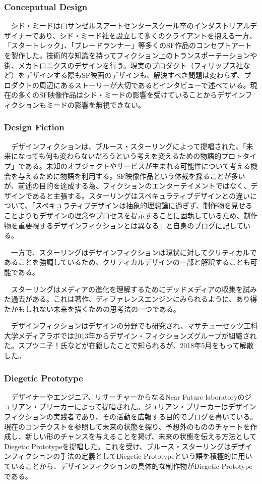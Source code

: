 \subsubsection{Conceputual Design}
　シド・ミードはロサンゼルスアートセンタースクール卒のインダストリアルデザイナーであり、シド・ミード社を設立して多くのクライアントを抱える一方、「スタートレック」、「ブレードランナー」等多くのSF作品のコンセプトアートを製作した。技術的な知識を持ってフィクション上のトランスポーテーションや街、メカトロニクスのデザインを行う。現実のプロダクト（フィリップス社など）をデザインする際もSF映画のデザインも、解決すべき問題は変わらず、プロダクトの周辺にあるストーリーが大切であるとインタビューで述べている。現在の多くのSF映像作品はシド・ミードの影響を受けていることからデザインフィクションもミードの影響を無視できない。

\subsubsection{Design Fiction}
　デザインフィクションは、ブルース・スターリングによって提唱された、「未来になっても何も変わらないだろうという考えを変えるための物語的プロトタイプ」である。未知のオブジェクトやサービスが生まれる可能性について考える機会を与えるために物語を利用する。SF映像作品という体裁を採ることが多いが、前述の目的を達成する為、フィクションのエンターテイメントではなく、デザインであると主張する。スターリングはスペキュラティブデザインとの違いについて、「スペキュラティブデザインは抽象的理想論に過ぎず、制作物を見せることよりもデザインの理念やプロセスを提示することに固執しているため、制作物を重要視するデザインフィクションとは異なる」と自身のブログに記している。

　一方で、スターリングはデザインフィクションは現状に対してクリティカルであることを強調しているため、クリティカルデザインの一部と解釈することも可能である。

　スターリングはメディアの進化を理解するためにデッドメディアの収集を試みた過去がある。これは著作、ディファレンスエンジンにみられるように、あり得たかもしれない未来を描くための思考法の一つである。

　デザインフィクションはデザインの分野でも研究され、マサチューセッツ工科大学メディアラボでは2013年からデザイン・フィクションズグループが組織された。スプツニ子！氏などが在籍したことで知られるが、2018年5月をもって解散した。

\subsubsection{Diegetic Prototype}
　デザイナーやエンジニア、リサーチャーからなるNear Future laboratoryのジュリアン・ブリーカーによって提唱された。ジュリアン・ブリーカーはデザインフィクションの実践者であり、その活動を広報する目的でブログを書いている。現在のコンテクストを参照して未来の状態を探り、予想外のもののチャートを作成し、新しい形のチャンスを与えることを掲げ、未来の状態を伝える方法としてDiegetic Prototypeを提唱した。これを受け、ブルース・スターリングはデザインフィクションの手法の定義としてDiegetic Prototypeという語を積極的に用いていることから、デザインフィクションの具体的な制作物がDiegetic Prototypeである。


